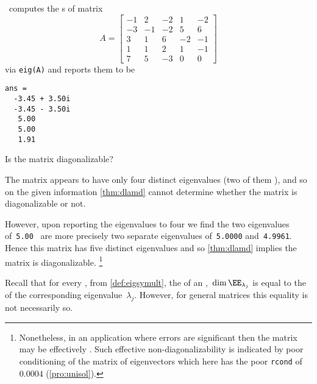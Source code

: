 \begin{example} 
\script\ computes the s of matrix
\begin{equation*}
A=\begin{bmatrix}-1&2&-2&1&-2
\\-3&-1&-2&5&6
\\3&1&6&-2&-1
\\1&1&2&1&-1
\\7&5&-3&0&0 \end{bmatrix}
\end{equation*}
via \verb|eig(A)| and reports them to be \twodp
\begin{verbatim}
ans =
  -3.45 + 3.50i
  -3.45 - 3.50i
   5.00
   5.00
   1.91
\end{verbatim}
Is the matrix diagonalizable?
\begin{solution} 
The matrix appears to have only four distinct eigenvalues (two of them ), and so on the given information \autoref{thm:dlamd} cannot determine whether the matrix is diagonalizable or not.

However, upon reporting the eigenvalues to four  we find the two eigenvalues of~\verb|5.00| \twodp\ are more precisely two separate eigenvalues of~\verb|5.0000| and~\verb|4.9961|.
Hence this matrix has five distinct eigenvalues and so \autoref{thm:dlamd} implies the matrix is diagonalizable.%
\footnote{Nonetheless, in an application where errors are significant then the matrix may be effectively .
Such effective non-diagonalizability is indicated by poor conditioning of the matrix of eigenvectors which here has the poor \texttt{rcond} of~\(0.0004\) (\autoref{pro:unisol}).}
\end{solution}
\end{example}






Recall that for every , from \autoref{def:eigsymult}, the  of an ,~\(\dim\EE_{\lambda_j}\) is equal to the  of the corresponding eigenvalue~\(\lambda_j\).
However, for general matrices this equality is not necessarily so.


